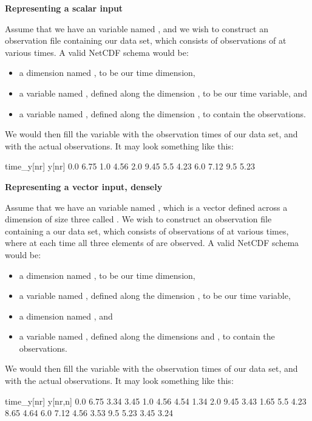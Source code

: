 \begin{example}
\noindent \textbf{Representing a scalar input}

Assume that we have an  variable named , and we wish to
construct an observation file containing our data set, which consists of
observations of  at various times. A valid NetCDF schema would be:
\begin{itemize}
\item a dimension named , to be our time dimension,
\item a variable named , defined along the dimension ,
  to be our time variable, and
\item a variable named , defined along the dimension , to
  contain the observations.
\end{itemize}
We would then fill the variable  with the observation times of
our data set, and  with the actual observations. It may look something
like this:

\begin{cmdcode}
time_y[nr]    y[nr]
       0.0     6.75
       1.0     4.56
       2.0     9.45
       5.5     4.23
       6.0     7.12
       9.5     5.23
\end{cmdcode}

\end{example}

\begin{example}
\noindent \textbf{Representing a vector input, densely}

Assume that we have an  variable named , which is a vector
defined across a dimension of size three called . We wish to construct
an observation file containing a our data set, which consists of observations
of  at various times, where at each time all three elements of
 are observed. A valid NetCDF schema would be:
\begin{itemize}
\item a dimension named , to be our time dimension,
\item a variable named , defined along the dimension ,
  to be our time variable,
\item a dimension named , and
\item a variable named , defined along the dimensions  and
  , to contain the observations.
\end{itemize}
We would then fill the variable  with the observation times of
our data set, and  with the actual observations. It may look something
like this:

\begin{cmdcode}
time_y[nr]     y[nr,n]
       0.0     6.75 3.34 3.45
       1.0     4.56 4.54 1.34
       2.0     9.45 3.43 1.65
       5.5     4.23 8.65 4.64
       6.0     7.12 4.56 3.53
       9.5     5.23 3.45 3.24
\end{cmdcode}

\end{example}

